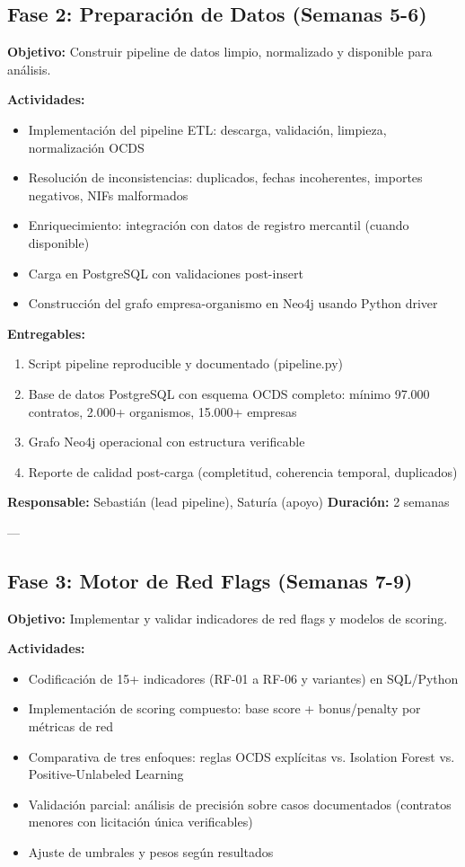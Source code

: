 \documentclass[11pt,a4paper,spanish]{book}
\numberwithin{equation}{chapter}
\numberwithin{figure}{chapter}
\begin{document}
\subsection{Fase 2: Preparación de Datos (Semanas 5-6)}

\textbf{Objetivo:} Construir pipeline de datos limpio, normalizado y disponible para análisis.

\textbf{Actividades:}
\begin{itemize}
\item Implementación del pipeline ETL: descarga, validación, limpieza, normalización OCDS
\item Resolución de inconsistencias: duplicados, fechas incoherentes, importes negativos, NIFs malformados
\item Enriquecimiento: integración con datos de registro mercantil (cuando disponible)
\item Carga en PostgreSQL con validaciones post-insert
\item Construcción del grafo empresa-organismo en Neo4j usando Python driver
\end{itemize}

\textbf{Entregables:}
\begin{enumerate}
\item Script pipeline reproducible y documentado (pipeline.py)
\item Base de datos PostgreSQL con esquema OCDS completo: mínimo 97.000 contratos, 2.000+ organismos, 15.000+ empresas
\item Grafo Neo4j operacional con estructura verificable
\item Reporte de calidad post-carga (completitud, coherencia temporal, duplicados)
\end{enumerate}

\textbf{Responsable:} Sebastián (lead pipeline), Saturía (apoyo)
\textbf{Duración:} 2 semanas

---

\subsection{Fase 3: Motor de Red Flags (Semanas 7-9)}

\textbf{Objetivo:} Implementar y validar indicadores de red flags y modelos de scoring.

\textbf{Actividades:}
\begin{itemize}
\item Codificación de 15+ indicadores (RF-01 a RF-06 y variantes) en SQL/Python
\item Implementación de scoring compuesto: base score + bonus/penalty por métricas de red
\item Comparativa de tres enfoques: reglas OCDS explícitas vs. Isolation Forest vs. Positive-Unlabeled Learning
\item Validación parcial: análisis de precisión sobre casos documentados (contratos menores con licitación única verificables)
\item Ajuste de umbrales y pesos según resultados
\end{itemize}
\end{document}
